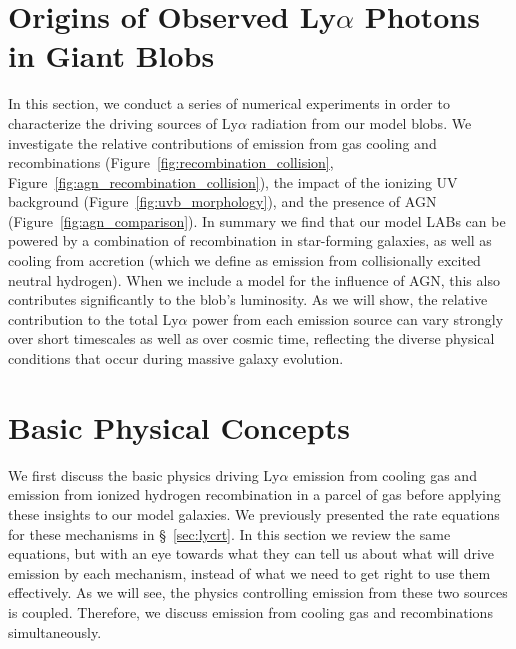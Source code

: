 \section{Origins of Observed Ly\texorpdfstring{$\alpha$}{a} Photons in Giant Blobs}
\label{sec:origins}

In this section, we conduct a series of numerical experiments in order to characterize the driving sources of Ly$\alpha$ radiation from our model blobs.
We investigate the relative contributions of emission from gas cooling and recombinations (Figure~\ref{fig:recombination_collision}, Figure~\ref{fig:agn_recombination_collision}), the impact of the ionizing UV background (Figure~\ref{fig:uvb_morphology}), and the presence of AGN (Figure~\ref{fig:agn_comparison}).
In summary we find that our model LABs can be powered by a combination of recombination in star-forming galaxies, as well as cooling from accretion (which we define as emission from collisionally excited neutral hydrogen).
When we include a model for the influence of AGN, this also contributes significantly to the blob's luminosity.
As we will show, the relative contribution to the total Ly$\alpha$ power from each emission source can vary strongly over short timescales as well as over cosmic time, reflecting the diverse physical conditions that occur during massive galaxy evolution.


\section{Basic Physical Concepts}
\label{sec:physicalconcepts}
We first discuss the basic physics driving Ly$\alpha$ emission from cooling gas and emission from ionized hydrogen recombination in a parcel of gas before applying these insights to our model galaxies.
We previously presented the rate equations for these mechanisms in \S~\ref{sec:lycrt}.
In this section we review the same equations, but with an eye towards what they can tell us about what will drive emission by each mechanism, instead of what we need to get right to use them effectively.
As we will see, the physics controlling emission from these two sources is coupled.
Therefore, we discuss emission from cooling gas and recombinations simultaneously.

